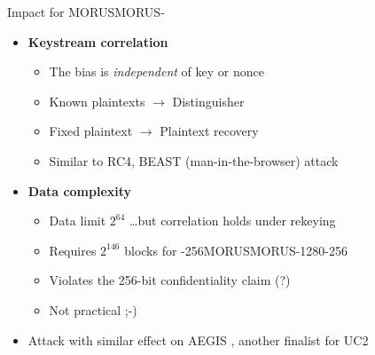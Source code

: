 \documentclass[aspectratio=169,table]{beamer}
\newcommand{\sn}[1]{\textcolor{gray}{\small #1}}
\newcommand{\cipher}[1]{\textsc{#1}}
\newcommand{\MORUS}[1][]{\ifx\relax#1\relax\cipher{MORUS}\else\cipher{MORUS-#1}\fi\xspace}
\begin{document}
\begin{frame}{Impact for \MORUS}%
  \begin{itemize}
    \item \textbf{Keystream correlation}
      \begin{itemize}
        \item The bias is \textit{independent} of key or nonce
        \item Known plaintexts $\to$ Distinguisher
        \item Fixed plaintext $\to$ Plaintext recovery
        \item Similar to RC4, BEAST (man-in-the-browser) attack
      \end{itemize}
      \pause
    \item \textbf{Data complexity}
      \begin{itemize}
        \item Data limit $2^{64}$
          \dots but correlation holds under rekeying
        \item Requires $2^{146}$ blocks for \MORUS[1280-256]
        \item Violates the 256-bit confidentiality claim (?)
        \item Not practical ;-)
      \end{itemize}
    \item Attack with similar effect on \cipher{AEGIS} \sn{\cite{AEGIS,sacryptMinaud14}}, another finalist for UC2\!
  \end{itemize}
\end{frame}%

\end{document}
